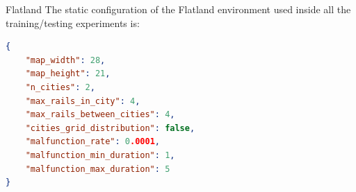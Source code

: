 \documentclass[10pt, xcolor={dvipsnames}]{beamer}
\begin{document}
\begin{frame}[fragile]{Flatland}
The static configuration of the \alert{Flatland} environment used inside all the training/testing experiments is:
\newline
\begin{lstlisting}[language=json,firstnumber=1]
{
    "map_width": 28,
    "map_height": 21,
    "n_cities": 2,
    "max_rails_in_city": 4,
    "max_rails_between_cities": 4,
    "cities_grid_distribution": false,
    "malfunction_rate": 0.0001,
    "malfunction_min_duration": 1,
    "malfunction_max_duration": 5
}
\end{lstlisting}
\end{frame}


\end{document}

